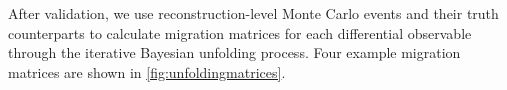 After validation, we use reconstruction-level Monte Carlo events and their truth counterparts to calculate migration matrices for each differential observable through the iterative Bayesian unfolding process. Four example migration matrices are shown in \ref{fig:unfoldingmatrices}. 

\begin{figure}[!h]
\centering
  \hfill
  \hfill
  \hfill
\end{figure}
